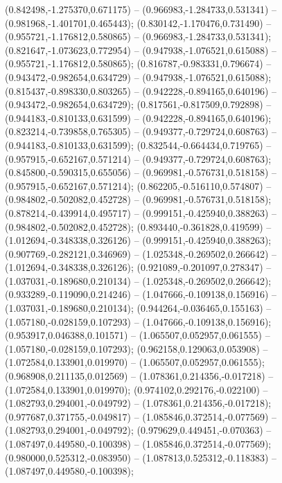  (0.842498,-1.275370,0.671175) -- (0.966983,-1.284733,0.531341) -- (0.981968,-1.401701,0.465443);
 (0.830142,-1.170476,0.731490) -- (0.955721,-1.176812,0.580865) -- (0.966983,-1.284733,0.531341);
 (0.821647,-1.073623,0.772954) -- (0.947938,-1.076521,0.615088) -- (0.955721,-1.176812,0.580865);
 (0.816787,-0.983331,0.796674) -- (0.943472,-0.982654,0.634729) -- (0.947938,-1.076521,0.615088);
 (0.815437,-0.898330,0.803265) -- (0.942228,-0.894165,0.640196) -- (0.943472,-0.982654,0.634729);
 (0.817561,-0.817509,0.792898) -- (0.944183,-0.810133,0.631599) -- (0.942228,-0.894165,0.640196);
 (0.823214,-0.739858,0.765305) -- (0.949377,-0.729724,0.608763) -- (0.944183,-0.810133,0.631599);
 (0.832544,-0.664434,0.719765) -- (0.957915,-0.652167,0.571214) -- (0.949377,-0.729724,0.608763);
 (0.845800,-0.590315,0.655056) -- (0.969981,-0.576731,0.518158) -- (0.957915,-0.652167,0.571214);
 (0.862205,-0.516110,0.574807) -- (0.984802,-0.502082,0.452728) -- (0.969981,-0.576731,0.518158);
 (0.878214,-0.439914,0.495717) -- (0.999151,-0.425940,0.388263) -- (0.984802,-0.502082,0.452728);
 (0.893440,-0.361828,0.419599) -- (1.012694,-0.348338,0.326126) -- (0.999151,-0.425940,0.388263);
 (0.907769,-0.282121,0.346969) -- (1.025348,-0.269502,0.266642) -- (1.012694,-0.348338,0.326126);
 (0.921089,-0.201097,0.278347) -- (1.037031,-0.189680,0.210134) -- (1.025348,-0.269502,0.266642);
 (0.933289,-0.119090,0.214246) -- (1.047666,-0.109138,0.156916) -- (1.037031,-0.189680,0.210134);
 (0.944264,-0.036465,0.155163) -- (1.057180,-0.028159,0.107293) -- (1.047666,-0.109138,0.156916);
 (0.953917,0.046388,0.101571) -- (1.065507,0.052957,0.061555) -- (1.057180,-0.028159,0.107293);
 (0.962158,0.129063,0.053908) -- (1.072584,0.133901,0.019970) -- (1.065507,0.052957,0.061555);
 (0.968908,0.211135,0.012569) -- (1.078361,0.214356,-0.017218) -- (1.072584,0.133901,0.019970);
 (0.974102,0.292176,-0.022100) -- (1.082793,0.294001,-0.049792) -- (1.078361,0.214356,-0.017218);
 (0.977687,0.371755,-0.049817) -- (1.085846,0.372514,-0.077569) -- (1.082793,0.294001,-0.049792);
 (0.979629,0.449451,-0.070363) -- (1.087497,0.449580,-0.100398) -- (1.085846,0.372514,-0.077569);
 (0.980000,0.525312,-0.083950) -- (1.087813,0.525312,-0.118383) -- (1.087497,0.449580,-0.100398);
